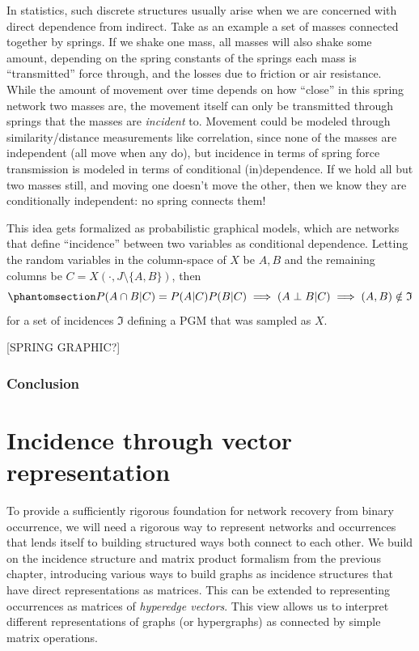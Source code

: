 \documentclass[%
	12pt,
		oneside,
		letterpaper
]{book}
\begin{document}
In statistics, such discrete structures usually arise when we are
concerned with direct dependence from indirect. Take as an example a set
of masses connected together by springs. If we shake one mass, all
masses will also shake some amount, depending on the spring constants of
the springs each mass is ``transmitted'' force through, and the losses
due to friction or air resistance. While the amount of movement over
time depends on how ``close'' in this spring network two masses are, the
movement itself can only be transmitted through springs that the masses
are \emph{incident} to. Movement could be modeled through
similarity/distance measurements like correlation, since none of the
masses are independent (all move when any do), but incidence in terms of
spring force transmission is modeled in terms of conditional
(in)dependence. If we hold all but two masses still, and moving one
doesn't move the other, then we know they are conditionally independent:
no spring connects them!

This idea gets formalized as probabilistic graphical models, which are
networks that define ``incidence'' between two variables as conditional
dependence. Letting the random variables in the column-space of \(X\) be
\(A,B\) and the remaining columns be \(C=X(\cdot,J\setminus \{A,B\})\),
then \begin{equation}\phantomsection\label{eq-cond-indep}{
P(A\cap B |C ) = P(A|C)P(B|C)\implies (A\perp B|C)\implies (A,B)\notin \mathfrak{I}
}\end{equation} for a set of incidences \(\mathfrak{I}\) defining a PGM
that was sampled as \(X\).

{[}SPRING GRAPHIC?{]}

\subsection{Conclusion}\label{conclusion}

\chapter{Incidence through vector
representation}\label{incidence-through-vector-representation}

To provide a sufficiently rigorous foundation for network recovery from
binary occurrence, we will need a rigorous way to represent networks and
occurrences that lends itself to building structured ways both connect
to each other. We build on the incidence structure and matrix product
formalism from the previous chapter, introducing various ways to build
graphs as incidence structures that have direct representations as
matrices. This can be extended to representing occurrences as matrices
of \emph{hyperedge vectors}. This view allows us to interpret different
representations of graphs (or hypergraphs) as connected by simple matrix
operations.
\end{document}
